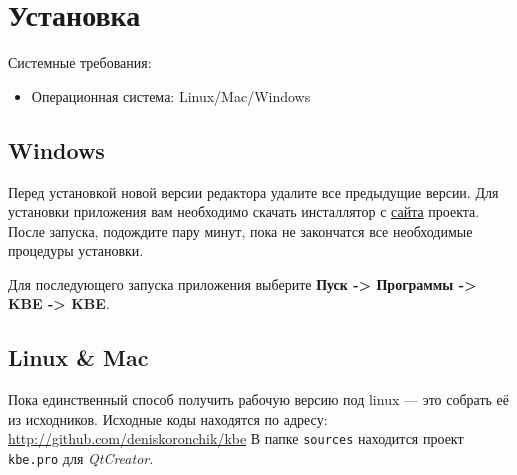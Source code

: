 \section{Установка}

Системные требования:
\begin{itemize}
	\item Операционная система: Linux/Mac/Windows
\end{itemize}

\subsection{Windows}

Перед установкой новой версии редактора удалите все пре\-дыдущие версии.
Для установки приложения вам необходимо скачать инсталлятор с \href{http://sourceforge.net/projects/ostis/}{сайта} проекта.
После запуска, подождите пару минут, пока не закончатся все необходимые процедуры установки.

Для последующего запуска приложения выберите \textbf{Пуск -> Программы -> KBE -> KBE}.

\subsection{Linux \& Mac}

Пока единственный способ получить рабочую версию под linux — это собрать её из исходников. Исходные коды находятся по адресу: \href{http://github.com/deniskoronchik/kbe}{http://github.com/deniskoronchik/kbe}
В папке {\tt sources} находится проект {\tt kbe.pro} для \textit{QtCreator}.